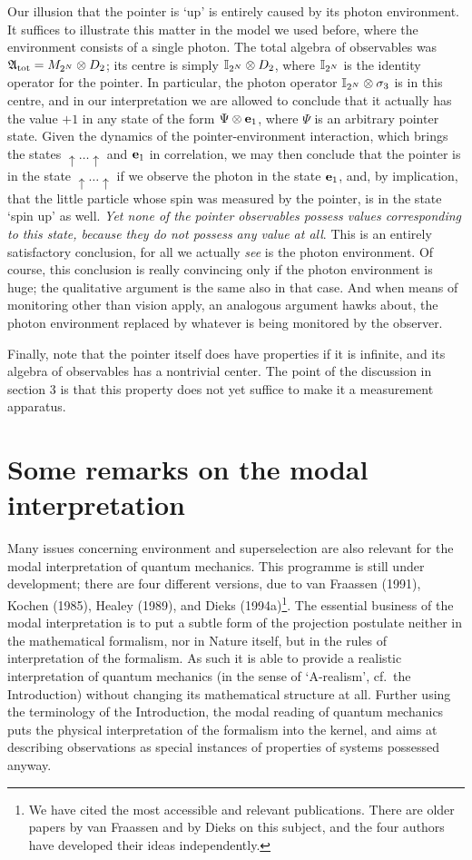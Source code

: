 \documentclass[12pt,titlepage]{article}
\newcommand{\sg}{\sigma}
\newcommand{\A}{\frak A}
\newcommand{\fn}{\footnote}
\newcommand{\ot}{\otimes}
\newcommand{\Up}{\uparrow\ldots\uparrow}
\begin{document}
Our illusion that the pointer is `up' is entirely caused by its photon
environment. It suffices to
illustrate this matter  in the model  we used
before, where the environment consists of a single photon. The total
algebra of observables was $\A_{\rm tot}=M_{2^N}\ot D_2$; its centre is simply
${\Bbb I}_{2^N}\ot
D_2$, where ${\Bbb I}_{2^N}$ is the identity operator for the pointer. In
particular, the photon
operator ${\Bbb I}_{2^N}\ot \sg_3$ is in this centre, and in our interpretation
we are allowed to
conclude that it actually has the value $+1$ in any state of the form $\Psi\ot
{\bf e}_1$, where
$\Psi$ is an arbitrary pointer state. Given the dynamics of the
pointer-environment interaction,
which brings the states $\Up$ and ${\bf e}_1$ in correlation, we may then
conclude that the pointer
is in the state $\Up$ if we observe the photon in the state ${\bf e}_1$, and,
by implication, that
the little particle whose spin was measured by the pointer, is in the state
`spin up' as well. {\em
Yet none of the pointer observables possess values corresponding to this state,
because they do not
possess any value at all}. This is an entirely satisfactory conclusion, for all
we actually {\em see} is the photon environment. Of course, this conclusion is
really convincing only
if the photon environment is huge; the qualitative argument is the same also in
that case. And when
means of monitoring other than vision apply, an analogous argument hawks about,
the photon environment
replaced by whatever is being monitored by the observer.

Finally, note that the pointer itself does have properties if it is infinite,
and its algebra of
observables has a nontrivial center. The point of the discussion in section 3
is that this property
does not yet suffice to make it a measurement apparatus.
 \section{Some remarks on the modal interpretation}
Many issues concerning environment and superselection are also relevant for the
modal
interpretation of quantum mechanics. This programme is still under development;
there are four
different versions, due to    van
Fraassen (1991), Kochen (1985),  Healey (1989),
and Dieks (1994a)\fn{We have cited the most accessible and relevant
publications. There are older
papers by van Fraassen and by Dieks on this subject, and the four authors have
developed their ideas
independently.}.
The essential business of the modal interpretation is to put a subtle form of
the projection
postulate neither in the mathematical formalism, nor in Nature itself, but in
the rules of
interpretation of the formalism.  As such it is able to provide a realistic
interpretation of quantum
mechanics (in the sense of `A-realism', cf.\ the Introduction) without changing
its mathematical
structure at all.  Further using the terminology of the Introduction, the modal
reading of quantum
mechanics  puts the physical interpretation of the formalism into the kernel,
and aims at describing
observations as special instances of properties of systems possessed anyway.
\end{document}
